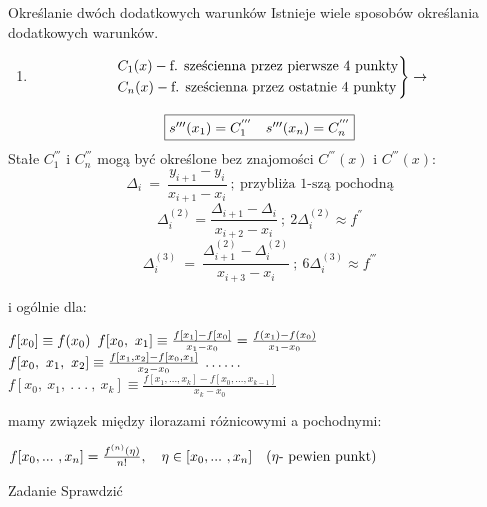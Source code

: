     \begin{frame}{Określanie dwóch dodatkowych warunków}
    	Istnieje wiele sposobów określania dodatkowych warunków.
       \begin{enumerate}
       \item  \[
		\begin{rcases*}
			C_{1}(x) - \textrm{f. sześcienna przez pierwsze 4 punkty}\\
			C_{n}(x) - \textrm{f. sześcienna przez ostatnie 4 punkty}
		\end{rcases*} \rightarrow
		\]	
       \end{enumerate}	
       \[
       		\framebox{$s'''(x_{1})=C^{'''}_{1}\ \ \ s'''(x_{n})=C^{'''}_{n}$}
       \]
        Stałe $C^{'''}_{1}$ i $C^{'''}_{n}$ mogą być określone bez znajomości 
        $C^{'''}(x)$ i $C^{'''}(x)$:
        \[
        	\Delta_{i}\ =\ \frac{y_{i+1}-y_{i}}
            {x_{i+1}-x_{i}}\ ;\ \textrm{przybliża 1-szą pochodną}
        \]
        \[
        	\Delta_{i}^{(2)}=\frac{\Delta_{i+1}-\Delta_{i}}
            {x_{i+2}-x_{i}}\ ;\ 2\Delta_{i}^{(2)}\approx f^{''}
        \]
        \[
        	\Delta_{i}^{(3)}\ =\ \frac{\Delta_{i+1}^{(2)}-\Delta_{i}^{(2)}}
            {x_{i+3}-x_{i}}\ ;\ 6\Delta_{i}^{(3)}\approx f^{'''}
        \]
    \end{frame}
    \begin{frame}
    	i ogólnie dla:
        \begin{flushright}
        	$f[x_{0}]\equiv f(x_{0}) \linebreak \linebreak$
            $f[x_{0},\ x_{1}]\equiv\frac{f[x_{1}]-f[x_{0}]}{x_{1}-
            x_{0}}=\frac{f(x_{1})-f(x_{0})}{x_{1}-x_{0}} 
            \linebreak \linebreak$
            $f[x_{0},\ x_{1},\ x_{2}]\equiv\frac{f[x_{1},x_{2}]-f[x_{0},x_{1}]}
            {x_{2}-x_{0}} \linebreak $
            $\ldots \ldots \linebreak$
            $f[x_{0},\ x_{1},\ .\ .\ .\ ,\ x_{k}]\equiv\frac{f[x_{1},\ldots,x_{k}]-f[x_{0},\ldots,x_{k-1}]}{x_{k}-x_{0}}$
        \end{flushright}
        mamy związek między ilorazami różnicowymi a pochodnymi:
        \begin{exampleblock}{}
        	$
            	\centering f[x_{0}, ... \ , x_{n}]=\frac{f^{(n)}(\eta)}
                {n!}, \ \ \ \eta \in [x_{0},... \ , x_{n}]
                \ \ \ (\eta \textrm{- pewien punkt})
            $
        \end{exampleblock}
        \begin{block}{Zadanie}
        	Sprawdzić
        \end{block}
        
    \end{frame}
